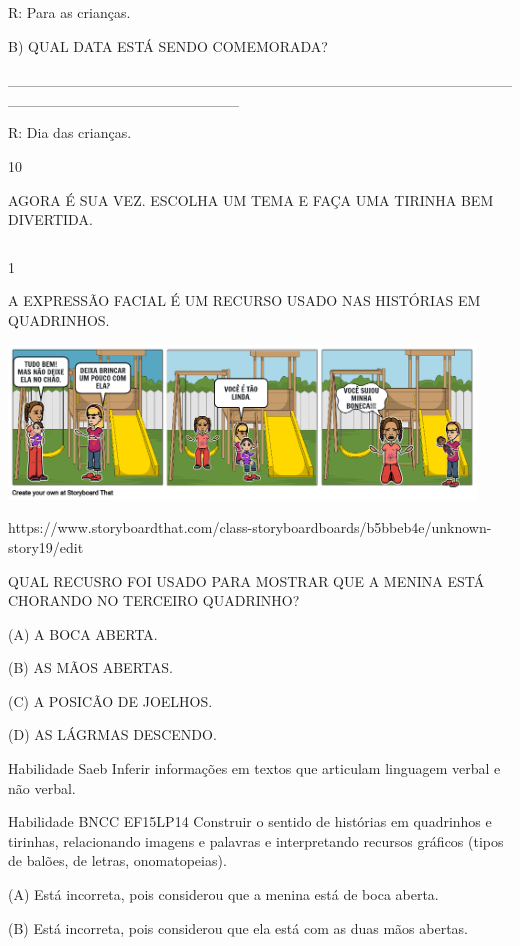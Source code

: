 {{{{{{R: Para as crianças.

B) QUAL DATA ESTÁ SENDO COMEMORADA?

\_\_\_\_\_\_\_\_\_\_\_\_\_\_\_\_\_\_\_\_\_\_\_\_\_\_\_\_\_\_\_\_\_\_\_\_\_\_\_\_\_\_\_\_\_\_\_\_\_\_\_\_\_\_\_\_\_\_\_\_\_\_\_\_\_\_\_\_\_\_

R: Dia das crianças.

\num{10}

AGORA É SUA VEZ. ESCOLHA UM TEMA E FAÇA UMA TIRINHA BEM DIVERTIDA.

\begin{longtable}[]{@{}ll@{}}
\toprule
&\tabularnewline
\bottomrule
\end{longtable}


\num{1}

A EXPRESSÃO FACIAL É UM RECURSO USADO NAS HISTÓRIAS EM QUADRINHOS.

\includegraphics[width=4.88436in,height=1.61667in]{media/image136.png}

https://www.storyboardthat.com/class-storyboardboards/b5bbeb4e/unknown-story19/edit

QUAL RECUSRO FOI USADO PARA MOSTRAR QUE A MENINA ESTÁ CHORANDO NO
TERCEIRO QUADRINHO?

(A) A BOCA ABERTA.

(B) AS MÃOS ABERTAS.

(C) A POSICÃO DE JOELHOS.

(D) AS LÁGRMAS DESCENDO.

\protect\hypertarget{_Hlk129246313}{}{}Habilidade Saeb Inferir
informações em textos que articulam linguagem verbal e não verbal.

Habilidade BNCC EF15LP14 Construir o sentido de histórias em quadrinhos
e tirinhas, relacionando imagens e palavras e interpretando recursos
gráficos (tipos de balões, de letras, onomatopeias).

(A) Está incorreta, pois considerou que a menina está de boca aberta.

(B) Está incorreta, pois considerou que ela está com as duas mãos
abertas.

}}}}}}
